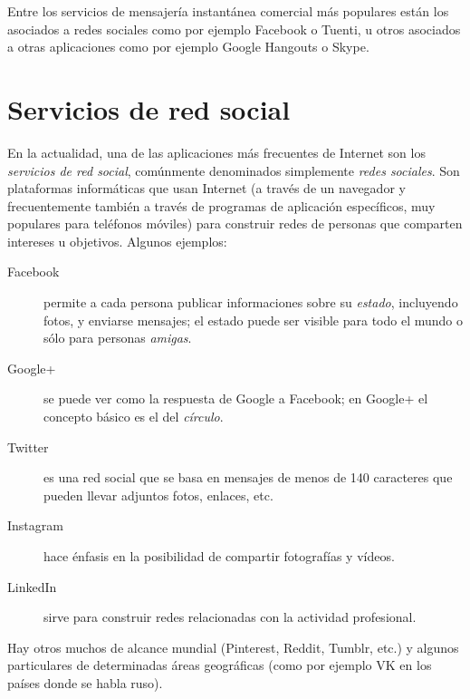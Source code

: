 Entre los servicios de mensajería instantánea comercial más populares están los asociados a redes sociales como por ejemplo Facebook o Tuenti, u otros asociados a otras aplicaciones como por ejemplo Google Hangouts o Skype. 

\section{Servicios de red social} \label{ss:xarsessocials} En la actualidad, una de las aplicaciones más frecuentes de Internet son los \emph{servicios de red social}, comúnmente denominados simplemente \emph{redes sociales}. Son plataformas informáticas que usan Internet (a través de un navegador y frecuentemente también a través de programas de aplicación específicos, muy populares para teléfonos móviles) para construir redes de personas que comparten intereses u objetivos. Algunos ejemplos: \begin{description} \item[Facebook] permite a cada persona publicar informaciones sobre su \emph{estado}, incluyendo fotos, y enviarse mensajes; el estado puede ser visible para todo el mundo o sólo para personas \emph{amigas}. \item[Google+] se puede ver como la respuesta de Google a Facebook; en Google+ el concepto básico es el del \emph{círculo}. \item[Twitter] es una red social que se basa en mensajes de menos de 140 caracteres que pueden llevar adjuntos fotos, enlaces, etc. \item[Instagram] hace énfasis en la posibilidad de compartir fotografías y vídeos. \item[LinkedIn] sirve para construir redes relacionadas con la actividad profesional. \end{description} Hay otros muchos de alcance mundial (Pinterest, Reddit, Tumblr, etc.) y algunos particulares de determinadas áreas geográficas (como por ejemplo VK en los países donde se habla ruso). 

